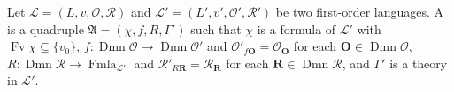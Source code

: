 Let $\mathcal{L} = (L, v, \mathcal{O}, \mathcal{R})$ and $\mathcal{L}' = (L', v', \mathcal{O}', \mathcal{R}')$ be two first-order languages. A  is a quadruple $\mathfrak{A} = (\chi, f, R, \Gamma')$ such that $\chi$ is a formula of $\mathcal{L}'$ with $\operatorname{Fv} \chi \subseteq \{v_0\}$, $f: \operatorname{Dmn} \mathcal{O} \rightarrow \operatorname{Dmn} \mathcal{O}'$ and $\mathcal{O}'_{f\mathbf{O}} = \mathcal{O}_{\mathbf{O}}$ for each $\mathbf{O} \in \operatorname{Dmn} \mathcal{O}$, $R: \operatorname{Dmn} \mathcal{R} \rightarrow \operatorname{Fmla}_{\mathcal{L}'}$ and $\mathcal{R}'_{R\mathbf{R}} = \mathcal{R}_{\mathbf{R}}$ for each $\mathbf{R} \in \operatorname{Dmn} \mathcal{R}$, and $\Gamma'$ is a theory in $\mathcal{L}'$.

